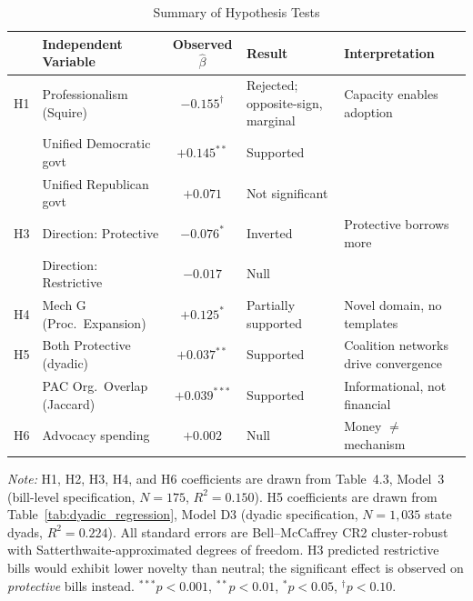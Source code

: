 \begin{table}[H]
\centering
\caption{Summary of Hypothesis Tests}
\label{tab:hyp_summary}
\renewcommand{\arraystretch}{1.25}
\setlength{\tabcolsep}{6pt}
\footnotesize
\begin{tabular}{@{}c >{\raggedright\arraybackslash}p{4.6cm} c >{\raggedright\arraybackslash}p{2.8cm} >{\raggedright\arraybackslash}p{4.2cm}@{}}
\toprule
 & \textbf{Independent Variable} & \textbf{Observed $\hat{\beta}$} & \textbf{Result} & \textbf{Interpretation} \\
\midrule
H1 & Professionalism (Squire) & $-0.155^{\dagger}$ & Rejected; opposite-sign, marginal & Capacity enables adoption \\
\addlinespace[3pt]
\multirow{2}{*}{H2}
   & Unified Democratic govt & $+0.145^{**}$  & Supported       & \multirow{2}{*}{Asymmetric partisan effect} \\
   & Unified Republican govt & $+0.071$       & Not significant &                                            \\
\addlinespace[3pt]
H3 & Direction: Protective & $-0.076^{*}$ & Inverted & Protective borrows more \\
   & Direction: Restrictive & $-0.017$ & Null & \\
\addlinespace[3pt]
H4 & Mech G (Proc.\ Expansion) & $+0.125^{*}$ & Partially supported & Novel domain, no templates \\
\addlinespace[3pt]
H5 & Both Protective (dyadic) & $+0.037^{**}$ & Supported & Coalition networks drive convergence \\
   & PAC Org.\ Overlap (Jaccard) & $+0.039^{***}$ & Supported & Informational, not financial \\
\addlinespace[3pt]
H6 & Advocacy spending & $+0.002$ & Null & Money $\neq$ mechanism \\
\bottomrule
\end{tabular}
\vspace{4pt}
\begin{minipage}{\textwidth}
\footnotesize
\textit{Note:} H1, H2, H3, H4, and H6 coefficients are drawn from Table~4.3, Model~3 (bill-level specification, $N = 175$, $R^{2} = 0.150$). H5 coefficients are drawn from Table~\ref{tab:dyadic_regression}, Model D3 (dyadic specification, $N = 1{,}035$ state dyads, $R^{2} = 0.224$). All standard errors are Bell--McCaffrey CR2 cluster-robust with Satterthwaite-approximated degrees of freedom. H3 predicted restrictive bills would exhibit lower novelty than neutral; the significant effect is observed on \textit{protective} bills instead. $^{***}p < 0.001$, $^{**}p < 0.01$, $^{*}p < 0.05$, $^{\dagger}p < 0.10$.
\end{minipage}
\end{table}

